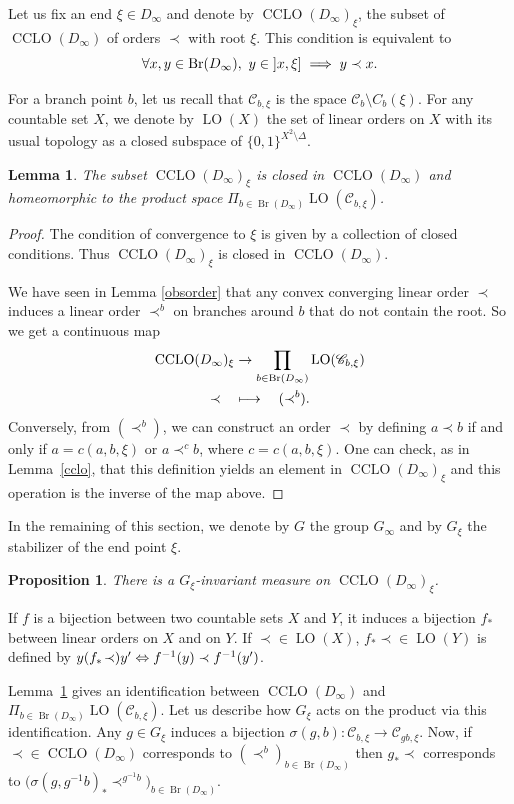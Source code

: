 \documentclass[JEP,XML,SOM,Unicode,NoFloatCountersInSection]{cedram}
\newcommand\mto{\mathchoice{\longmapsto}{\mapsto}{\mapsto}{\mapsto}}
\newcommand\implique{\mathchoice{\implies}{\Rightarrow}{\Rightarrow}{\Rightarrow}}
\newcommand\ssi{\mathchoice{\iff}{\Leftrightarrow}{\Leftrightarrow}{\Leftrightarrow}}
\let\mathcal\mathscr
\theoremstyle{plain}
\newtheorem{lem}[thm]{Lemma}
\newtheorem{prop}[thm]{Proposition}
\theoremstyle{definition}
\newcommand{\cC}{\mathcal{C}}
\DeclareMathOperator{\Br}{Br}
\DeclareMathOperator{\CLO}{CCLO}
\DeclareMathOperator{\LO}{LO}
\begin{document}
Let us fix an end $\xi\in D_\infty$ and denote by $\CLO(D_\infty)_\xi$, the subset of $\CLO(D_\infty)$ of orders $\prec$ with root $\xi$. This condition is equivalent to
\[
\forall x,y\in\Br(D_\infty),\ y\in{}]x,\xi]\implique y\prec x.
\]

For a branch point $b$, let us recall that $\cC_{b,\xi}$ is the space $\cC_b\setminus C_b(\xi)$. For any countable set $X$, we denote by $\LO(X)$ the set of linear orders on $X$ with its usual topology as a closed subspace of $\{0,1\}^{X^2\setminus\Delta}$.
\begin{lem}\label{identification} The subset $\CLO(D_\infty)_\xi$ is closed in $\CLO(D_\infty)$ and homeomorphic to the product space $\Pi_{b\in\Br(D_\infty)}\LO(\cC_{b,\xi})$.\end{lem}

\begin{proof}The condition of convergence to $\xi$ is given by a collection of closed conditions. Thus $\CLO(D_\infty)_\xi$ is closed in $\CLO(D_\infty)$.

We have seen in Lemma \ref{obsorder} that any convex converging linear order $\prec$ induces a linear order $\prec^b$ on branches around $b$ that do not contain the root. So we get a continuous map
\begin{align*}
\CLO(D_\infty)_\xi&\to\prod_{b\in\Br(D_\infty)}\LO(\cC_{b,\xi})\\
\prec\quad&\mto\quad(\prec^b).
\end{align*}
Conversely, from $(\prec^b)$, we can construct an order $\prec$ by defining $a\prec b$ if and only if $a=c(a,b,\xi)$ or $a\prec^c b$, where $c=c(a,b,\xi)$. One can check, as in Lemma~\ref{cclo}, that this definition yields an element in $\CLO(D_\infty)_\xi$ and this operation is the inverse of the map above.
\end{proof}

In the remaining of this section, we denote by $G$ the group $G_\infty$ and by $G_\xi$ the stabilizer of the end point $\xi$.

\begin{prop}\label{invmeas}There is a $G_\xi$-invariant measure on $\CLO(D_\infty)_\xi$.
\end{prop}

If $f$ is a bijection between two countable sets $X$ and $Y$, it induces a bijection $f_*$ between linear orders on $X$ and on $Y$. If $\prec\in\LO(X)$, $f_*\!\prec\in\LO(Y)$ is defined by $y(f_*\!\prec)y'\ssi f^{-1}(y)\prec f^{-1}(y')$.

Lemma~\ref{identification} gives an identification between $\CLO(D_\infty)$ and $\Pi_{b\in\Br(D_\infty)}\LO(\cC_{b,\xi})$. Let us describe how $G_\xi$ acts on the product via this identification. Any $g\in G_\xi$ induces a bijection $\sigma(g,b)\colon \cC_{b,\xi}\to\cC_{gb,\xi}$.
Now, if $\prec\in\CLO(D_\infty)$ corresponds to $(\prec^b)_{b\in\Br(D_\infty)}$ then $g_*\!\prec$ corresponds to $\bigl(\sigma(g,g^{-1}b)_*\!\prec^{g^{-1}b}\bigr)_{b\in\Br(D_\infty)}$.
\end{document}
